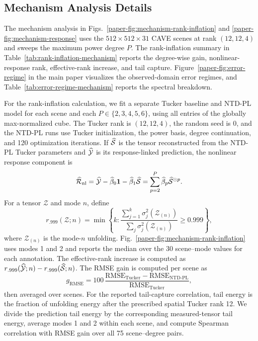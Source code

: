 \subsection{Mechanism Analysis Details}
\label{supp:mechanism-details}

The mechanism analysis in Figs.~\ref{paper-fig:mechanism-rank-inflation} and
\ref{paper-fig:mechanism-response} uses the \(512\times512\times31\) CAVE scenes at
rank $(12,12,4)$ and
sweeps the maximum power degree \(P\). The rank-inflation summary in
Table~\ref{tab:rank-inflation-mechanism} reports the degree-wise gain,
nonlinear-response rank, effective-rank increase, and tail capture.
Figure~\ref{paper-fig:error-regime} in the main paper visualizes the
observed-domain error regimes, and Table~\ref{tab:error-regime-mechanism}
reports the spectral breakdown.

For the rank-inflation calculation, we fit a separate Tucker baseline and
NTD-PL model for each scene and each \(P\in\{2,3,4,5,6\}\), using all entries of
the globally max-normalized cube. The Tucker rank is \((12,12,4)\), the random
seed is 0, and the NTD-PL runs use Tucker initialization, the power basis,
degree continuation, and 120 optimization iterations. If \(\widehat{\mathcal{S}}\) is
the tensor reconstructed from the NTD-PL Tucker parameters and \(\widehat{\mathcal{Y}}\)
is its response-linked prediction, the nonlinear response component is
\[
 \widehat{\mathcal{R}}_{\mathrm{nl}}
 =\widehat{\mathcal{Y}}-\widehat\beta_0\mathbf{1}
 -\widehat\beta_1\widehat{\mathcal{S}}
 =\sum_{p=2}^{P}\widehat\beta_p\widehat{\mathcal{S}}^{\odot p}.
\]
For a tensor \(\mathcal{Z}\) and mode \(n\), define
\[
 r_{.999}(\mathcal{Z};n)=\min\left\{k:
 \frac{\sum_{j=1}^{k}\sigma_j^2(\mathcal{Z}_{(n)})}
 {\sum_j\sigma_j^2(\mathcal{Z}_{(n)})}\geq 0.999\right\},
\]
where \(\mathcal{Z}_{(n)}\) is the mode-\(n\) unfolding. Fig.~\ref{paper-fig:mechanism-rank-inflation}
uses modes 1 and 2 and reports the median over the 30 scene--mode values for
each annotation. The effective-rank increase is computed as
\(r_{.999}(\widehat{\mathcal{Y}};n)-r_{.999}(\widehat{\mathcal{S}};n)\).
The RMSE gain is computed per scene as
\[
 g_{\mathrm{RMSE}}=100\,
 \frac{\mathrm{RMSE}_{\mathrm{Tucker}}-
 \mathrm{RMSE}_{\mathrm{NTD\text{-}PL}}}
 {\mathrm{RMSE}_{\mathrm{Tucker}}},
\]
then averaged over scenes.
For the reported tail-capture correlation, tail energy is the fraction of
unfolding energy after the prescribed spatial Tucker rank 12. We divide the
prediction tail energy by the corresponding measured-tensor tail energy,
average modes 1 and 2 within each scene, and compute Spearman correlation with
RMSE gain over all 75 scene--degree pairs.

